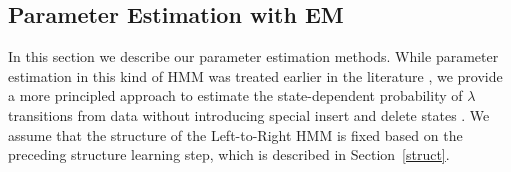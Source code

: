 \documentclass[letterpaper]{article}
\begin{document}

\subsection{Parameter Estimation with EM}
\label{em}

In this section we describe our parameter estimation methods.  While parameter estimation in this kind of HMM was treated earlier in the literature \cite{rabiner,bahl}, we provide a more principled approach to estimate the state-dependent probability of $\lambda$ transitions from data without introducing special insert and delete states \cite{profileHMMs}. We assume that the structure of the Left-to-Right HMM is fixed based on the preceding structure learning step, which is described in Section~\ref{struct}.

\end{document}
